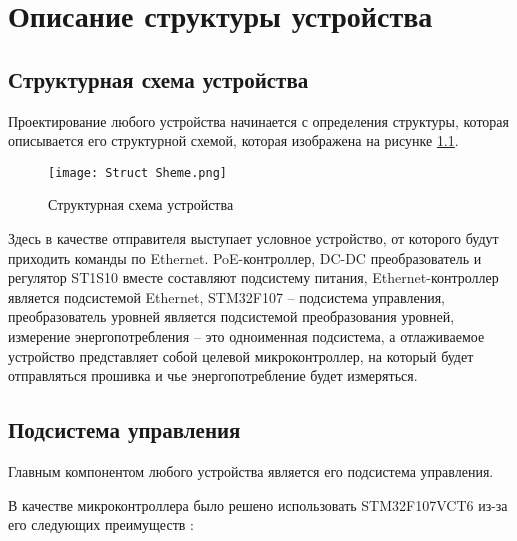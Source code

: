 
\chapter{Описание структуры устройства}

\section{Структурная схема устройства}
\hspace{1cm}

Проектирование любого устройства начинается с определения структуры, которая описывается
его структурной схемой, которая изображена
на рисунке \ref{ris:261}.

\begin{figure}[H]
  \centering
  \texttt{[image: Struct Sheme.png]}
  \caption{Структурная схема устройства}
  \label{ris:261}
\end{figure}

Здесь в качестве отправителя выступает условное устройство, от которого будут приходить
команды по Ethernet. PoE-контроллер, DC-DC преобразователь и регулятор ST1S10 вместе составляют 
подсистему питания,
Ethernet-контроллер является подсистемой Ethernet, STM32F107 -- подсистема управления, 
преобразователь уровней является подсистемой преобразования уровней, измерение энергопотребления --
это одноименная подсистема, а отлаживаемое устройство представляет собой целевой микроконтроллер,
на который будет отправляться прошивка и чье энергопотребление будет измеряться.

\section{Подсистема управления}
\hspace{1cm} 

Главным компонентом любого устройства является его подсистема управления.

В качестве микроконтроллера было решено использовать
STM32F107VCT6 из-за его следующих преимуществ \cite{STM32:datasheet}:

